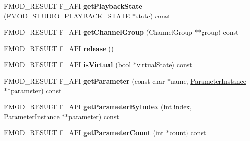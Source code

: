 \begin{DoxyCompactItemize}
\item 
\hypertarget{class_f_m_o_d_1_1_studio_1_1_event_instance_a441840f83e772c20ecd663245c511cb9}{F\+M\+O\+D\+\_\+\+R\+E\+S\+U\+L\+T F\+\_\+\+A\+P\+I {\bfseries get\+Playback\+State} (F\+M\+O\+D\+\_\+\+S\+T\+U\+D\+I\+O\+\_\+\+P\+L\+A\+Y\+B\+A\+C\+K\+\_\+\+S\+T\+A\+T\+E $\ast$\hyperlink{structstate}{state}) const }\label{class_f_m_o_d_1_1_studio_1_1_event_instance_a441840f83e772c20ecd663245c511cb9}

\item 
\hypertarget{class_f_m_o_d_1_1_studio_1_1_event_instance_a7d59d7281cb728035453b28d6ff74f26}{F\+M\+O\+D\+\_\+\+R\+E\+S\+U\+L\+T F\+\_\+\+A\+P\+I {\bfseries get\+Channel\+Group} (\hyperlink{class_f_m_o_d_1_1_channel_group}{Channel\+Group} $\ast$$\ast$group) const }\label{class_f_m_o_d_1_1_studio_1_1_event_instance_a7d59d7281cb728035453b28d6ff74f26}

\item 
\hypertarget{class_f_m_o_d_1_1_studio_1_1_event_instance_a01ea7def87339c537719145ac1b1dc67}{F\+M\+O\+D\+\_\+\+R\+E\+S\+U\+L\+T F\+\_\+\+A\+P\+I {\bfseries release} ()}\label{class_f_m_o_d_1_1_studio_1_1_event_instance_a01ea7def87339c537719145ac1b1dc67}

\item 
\hypertarget{class_f_m_o_d_1_1_studio_1_1_event_instance_a53abd8ddcddec1901a45375912c49465}{F\+M\+O\+D\+\_\+\+R\+E\+S\+U\+L\+T F\+\_\+\+A\+P\+I {\bfseries is\+Virtual} (bool $\ast$virtual\+State) const }\label{class_f_m_o_d_1_1_studio_1_1_event_instance_a53abd8ddcddec1901a45375912c49465}

\item 
\hypertarget{class_f_m_o_d_1_1_studio_1_1_event_instance_a89fcd9699984089b00bd1625b3e4ae0b}{F\+M\+O\+D\+\_\+\+R\+E\+S\+U\+L\+T F\+\_\+\+A\+P\+I {\bfseries get\+Parameter} (const char $\ast$name, \hyperlink{class_f_m_o_d_1_1_studio_1_1_parameter_instance}{Parameter\+Instance} $\ast$$\ast$parameter) const }\label{class_f_m_o_d_1_1_studio_1_1_event_instance_a89fcd9699984089b00bd1625b3e4ae0b}

\item 
\hypertarget{class_f_m_o_d_1_1_studio_1_1_event_instance_a1e9b320489d2219126d999d8d9fb2c18}{F\+M\+O\+D\+\_\+\+R\+E\+S\+U\+L\+T F\+\_\+\+A\+P\+I {\bfseries get\+Parameter\+By\+Index} (int index, \hyperlink{class_f_m_o_d_1_1_studio_1_1_parameter_instance}{Parameter\+Instance} $\ast$$\ast$parameter) const }\label{class_f_m_o_d_1_1_studio_1_1_event_instance_a1e9b320489d2219126d999d8d9fb2c18}

\item 
\hypertarget{class_f_m_o_d_1_1_studio_1_1_event_instance_aece2bebf19eb679929cc49c347218666}{F\+M\+O\+D\+\_\+\+R\+E\+S\+U\+L\+T F\+\_\+\+A\+P\+I {\bfseries get\+Parameter\+Count} (int $\ast$count) const }\label{class_f_m_o_d_1_1_studio_1_1_event_instance_aece2bebf19eb679929cc49c347218666}


\end{DoxyCompactItemize}
